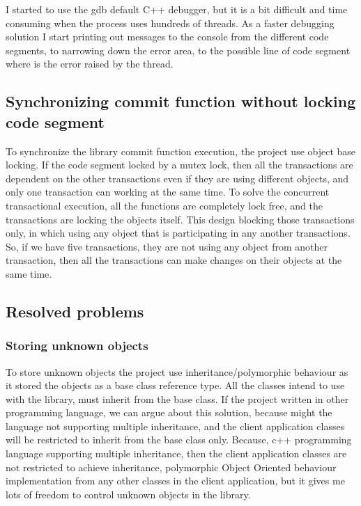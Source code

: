 \documentclass[12pt]{article}
\begin{document}
I started to use the gdb default C++ debugger, but it is a bit difficult and time consuming when the process uses hundreds of threads. As a faster debugging solution I start printing out messages to the console from the different code segments, to narrowing down the error area, to the possible line of code segment where is the error raised by the thread.    

\subsection{Synchronizing commit function without locking code segment }
To synchronize the library commit function execution, the project use object base locking. If the code segment locked by a mutex lock, then all the transactions are dependent on the other transactions even if they are using different objects, and only one transaction can working at the same time. To solve the concurrent transactional execution, all the functions are completely lock free, and the transactions are locking the objects itself. This design blocking those transactions only, in which using any object that is participating in any another transactions. So, if we have five transactions, they are not using any object from another transaction, then all the transactions can make changes on their objects at the same time. 


\subsection{Resolved problems }

\subsubsection{Storing unknown objects }
To store unknown objects the project use inheritance/polymorphic behaviour as it stored the objects as a base class reference type. All the classes intend to use with the library, must inherit from the base class. If the project written in other programming language, we can argue about this solution, because might the language not supporting multiple inheritance, and the client application classes will be restricted to inherit from the base class only. Because, c++ programming language supporting multiple inheritance, then the client application classes are not restricted to achieve inheritance, polymorphic Object Oriented behaviour implementation from any other classes in the client application, but it gives me lots of freedom to control unknown objects in the library.
\end{document}
